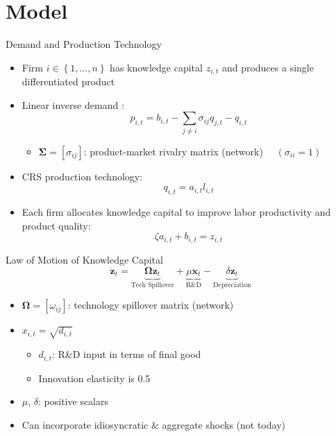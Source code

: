 \documentclass[
  10pt,               %
  aspectratio=169,     %
]{beamer}
\theoremstyle{plain}
\begin{document}
\section{Model}
\begin{frame}{Demand and Production Technology}

  \label{static_game}
\begin{itemize}
    \item Firm $i\in \left\{1,\ldots,n\right\}$ has knowledge capital $z_{i,t}$ and produces a single differentiated product
          \medskip{}\pause
    \item Linear inverse demand \citep{Pellegrino2024-dn}: \[p_{i,t}=b_{i,t}-\sum_{j\neq i}\sigma_{ij}q_{j,t} - q_{i,t}\]
          \begin{itemize}
            \item $\bm{\Sigma}=\left[\sigma_{ij}\right]$: product-market rivalry matrix (network) $\quad (\sigma_{ii} = 1)$
          \end{itemize}
          \medskip{}\pause
    \item CRS production technology: \[q_{i,t}=a_{i,t}l_{i,t}\]\pause
    \item Each firm allocates knowledge capital to improve labor productivity and product quality:
          \[
            \zeta a_{i,t}+b_{i,t}=z_{i,t}
          \]
  \end{itemize}
\end{frame}
%
\begin{frame}{Law of Motion of Knowledge Capital}
  \[
    \dot{\bm{z}}_{t}=\underbrace{\bm{\Omega}\bm{z}_{t}}_{\text{Tech Spillover}}+\underbrace{\mu\bm{x}_{t}}_{\text{R\&D}}-\underbrace{\delta\bm{z}_{t}}_{\text{Depreciation}}
  \]
  \begin{itemize}
    \item $\bm{\Omega}=\left[\omega_{ij}\right]$: technology spillover matrix (network)\medskip{}
    \item $x_{i,t}=\sqrt{d_{i,t}}$
          \begin{itemize}
            \item $d_{i,t}$: R\&D input in terms of final good
            \item Innovation elasticity is 0.5\medskip{}
          \end{itemize}
    \item $\mu$, $\delta$: positive scalars
          \medskip{}
    \item Can incorporate idiosyncratic \& aggregate shocks (not today)
  \end{itemize}
\end{frame}
\end{document}
